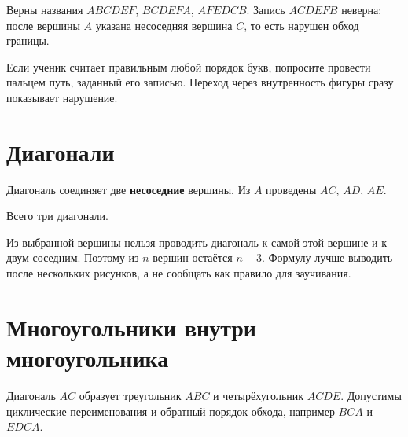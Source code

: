 \correctnamingfigure

\begin{thinkbox}
  Верны названия \(ABCDEF\), \(BCDEFA\), \(AFEDCB\). Запись \(ACDEFB\)
  неверна: после вершины \(A\) указана несоседняя вершина \(C\), то есть
  нарушен обход границы.
\end{thinkbox}

\begin{teacherbox}[Диагностика]
  Если ученик считает правильным любой порядок букв, попросите провести
  пальцем путь, заданный его записью. Переход через внутренность фигуры сразу
  показывает нарушение.
\end{teacherbox}

\clearpage
\section{Диагонали}

\diagonalfigure

\begin{propertybox}[Ответ]
  Диагональ соединяет две \textbf{несоседние} вершины. Из \(A\) проведены
  \(AC\), \(AD\), \(AE\).
\end{propertybox}

\begin{practicebox}
  \hexagondiagonalsanswer
  Всего три диагонали.
\end{practicebox}

\begin{teacherbox}[Почему \(n-3\)]
  Из выбранной вершины нельзя проводить диагональ к самой этой вершине и к
  двум соседним. Поэтому из \(n\) вершин остаётся \(n-3\). Формулу лучше
  выводить после нескольких рисунков, а не сообщать как правило для
  заучивания.
\end{teacherbox}

\section{Многоугольники внутри многоугольника}

\pentagonsplitfigure

\begin{practicebox}
  Диагональ \(AC\) образует треугольник \(ABC\) и четырёхугольник
  \(ACDE\). Допустимы циклические переименования и обратный порядок обхода,
  например \(BCA\) и \(EDCA\).
\end{practicebox}

\quadrilateralregionsfigure

